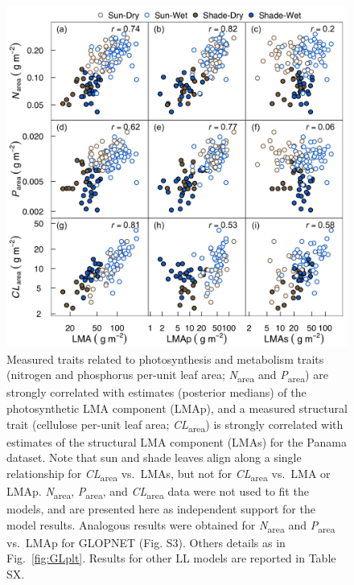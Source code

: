 \documentclass[
  12pt,
]{article}
\begin{document}
\begin{figure}
\hypertarget{fig:PA-NPC}{%
\centering
\includegraphics{../figs/PA_NPC.png}
\caption{Measured traits related to photosynthesis and metabolism traits (nitrogen and phosphorus per-unit leaf area; \emph{N}\textsubscript{area} and \emph{P}\textsubscript{area}) are strongly correlated with estimates (posterior medians) of the photosynthetic LMA component (LMAp), and a measured structural trait (cellulose per-unit leaf area; \emph{CL}\textsubscript{area}) is strongly correlated with estimates of the structural LMA component (LMAs) for the Panama dataset.
Note that sun and shade leaves align along a single relationship for \emph{CL}\textsubscript{area} vs.~LMAs, but not for \emph{CL}\textsubscript{area} vs.~LMA or LMAp. \emph{N}\textsubscript{area}, \emph{P}\textsubscript{area}, and \emph{CL}\textsubscript{area} data were not used to fit the models, and are presented here as independent support for the model results.
Analogous results were obtained for \emph{N}\textsubscript{area} and \emph{P}\textsubscript{area} vs.~LMAp for GLOPNET (Fig. S3).
Others details as in Fig.~\ref{fig:GLplt}.
Results for other LL models are reported in Table SX.}\label{fig:PA-NPC}
}
\end{figure}
\end{document}
